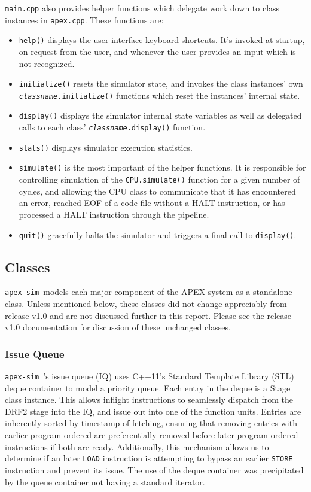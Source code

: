 \documentclass[12pt]{article}
\newcommand{\codename}[0]{\texttt{apex-sim}~}
\begin{document}
\texttt{main.cpp} also provides helper functions which delegate work down to class instances in \texttt{apex.cpp}. These functions are:
\begin{itemize}
  \item \texttt{help()} displays the user interface keyboard shortcuts. It's invoked at startup, on request from the user, and whenever the user provides an input which is not recognized.
  \item \texttt{initialize()} resets the simulator state, and invokes the class instances' own \texttt{\textit{classname}.initialize()} functions which reset the instances' internal state.
  \item \texttt{display()} displays the simulator internal state variables as well as delegated calls to each class' \texttt{\textit{classname}.display()} function.
  \item \texttt{stats()} displays simulator execution statistics.
  \item \texttt{simulate()} is the most important of the helper functions. It is responsible for controlling simulation of the \texttt{CPU.simulate()} function for a given number of cycles, and allowing the CPU class to communicate that it has encountered an error, reached EOF of a code file without a HALT instruction, or has processed a HALT instruction through the pipeline.
  \item \texttt{quit()} gracefully halts the simulator and triggers a final call to \texttt{display()}.
\end{itemize}

\subsection{Classes}
\label{sec:classes}
\codename models each major component of the APEX system as a standalone class. Unless mentioned below, these classes did not change appreciably from release v1.0 and are not discussed further in this report. Please see the release v1.0 documentation for discussion of these unchanged classes.

\subsubsection{Issue Queue}
\label{sec:iq}
\codename's issue queue (IQ) uses C++11's Standard Template Library (STL) deque container to model a priority queue. 
Each entry in the deque is a Stage class instance. 
This allows inflight instructions to seamlessly dispatch from the DRF2 stage into the IQ, and issue out into one of the function units. 
Entries are inherently sorted by timestamp of fetching, ensuring that removing entries with earlier program-ordered are preferentially removed before later program-ordered instructions if both are ready. 
Additionally, this mechanism allows us to determine if an later \texttt{LOAD} instruction is attempting to bypass an earlier \texttt{STORE} instruction and prevent its issue. 
The use of the deque container was precipitated by the queue container not having a standard iterator.
\end{document}
